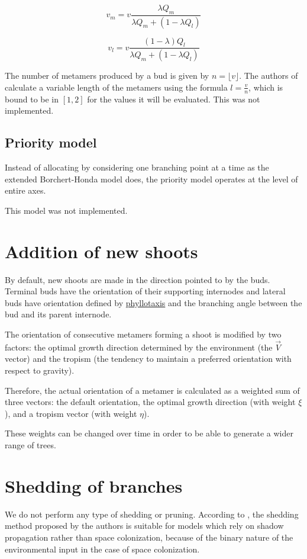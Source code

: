 \documentclass{article}
\begin{document}
\[v_m = v \frac{\lambda Q_m}{\lambda Q_m + (1 - \lambda Q_l)}\]

\[v_l = v \frac{(1 - \lambda) Q_l}{\lambda Q_m + (1 - \lambda Q_l)}\]

The number of metamers produced by a bud is given by \(n = \lfloor v \rfloor\). The authors of \cite{Palubicki2009} calculate a variable length of the metamers using the formula \(l = \frac{v}{n}\), which is bound to be in \([1, 2]\) for the values it will be evaluated.
This was not implemented.

\subsection{Priority model}

Instead of allocating by considering one branching point at a time as the extended Borchert-Honda model does, the priority model operates at the level of entire axes.

This model was not implemented.

\section{Addition of new shoots}

By default, new shoots are made in the direction pointed to by the buds.
Terminal buds have the orientation of their supporting internodes and lateral buds have orientation defined by \href{https://en.wikipedia.org/wiki/Phyllotaxis}{phyllotaxis} and the branching angle between the bud and its parent internode.

The orientation of consecutive metamers forming a shoot is modified by two factors: the optimal growth direction determined by the environment (the \(\vec{V}\) vector) and the tropism (the tendency to maintain a preferred orientation with respect to gravity).

Therefore, the actual orientation of a metamer is calculated as a weighted sum of three vectors: the default orientation, the optimal growth direction (with weight \(\xi\)), and a tropism vector (with weight \(\eta\)).

These weights can be changed over time in order to be able to generate a wider range of trees.

\section{Shedding of branches}

We do not perform any type of shedding or pruning. According to \cite{Palubicki2009}, the shedding method proposed by the authors is suitable for models which rely on shadow propagation rather than space colonization, because of the binary nature of the environmental input in the case of space colonization.
\end{document}

